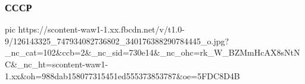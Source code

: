  
 
 

\clearpage
\subsubsection{СССР}

\ifcmt
pic https://scontent-waw1-1.xx.fbcdn.net/v/t1.0-9/126143325_747934082736802_340176388290784445_o.jpg?_nc_cat=102&ccb=2&_nc_sid=730e14&_nc_ohc=rk_W_BZMmHcAX8sNtNC&_nc_ht=scontent-waw1-1.xx&oh=988dab158077315451ed555373853787&oe=5FDC8D4B
\fi
